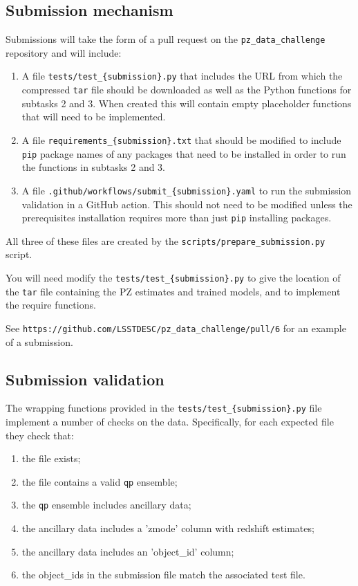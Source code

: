 \documentclass[11pt,twoside,letterpaper,onecolumn,english]{article}
\begin{document}
\subsection{Submission mechanism}

Submissions will take the form of a pull request on the
\texttt{pz\_data\_challenge} repository and will include:

\begin{enumerate}
  \item{A file \texttt{tests/test\_\{submission\}.py} that includes the
      URL from which the compressed \texttt{tar} file should be downloaded
      as well as the Python functions for subtasks 2 and 3.   When
      created this will contain empty placeholder functions that will
      need to be implemented.}
   \item{A file \texttt{requirements\_\{submission\}.txt} that should
       be modified to include \texttt{pip} package names of any
       packages that need to be installed in order to run the
       functions in subtasks 2 and 3.}     
   \item{A file \texttt{.github/workflows/submit\_\{submission\}.yaml} to
       run the submission validation in a GitHub action.  This should
       not need to be modified unless the prerequisites installation
       requires more than just \texttt{pip}  installing packages.}
\end{enumerate}

All three of these files are created by the
\texttt{scripts/prepare\_submission.py} script.  

You will need modify the \texttt{tests/test\_\{submission\}.py} to
give the location of the \texttt{tar} file containing the PZ estimates
and trained models, and to implement the require functions.

See \texttt{https://github.com/LSSTDESC/pz\_data\_challenge/pull/6}
for an example of a submission.


\subsection{Submission validation}

The wrapping functions provided in the \texttt{tests/test\_\{submission\}.py}
file implement a number of \allowbreak checks on the data. Specifically, for each
expected file they check that:

\begin{enumerate}
    \item{the file exists;}
    \item{the file contains a valid \texttt{qp} ensemble;}
    \item{the \texttt{qp} ensemble includes ancillary data;}
    \item{the ancillary data includes a 'zmode' column with redshift
        estimates;}
    \item{the ancillary data includes an 'object\_id' column;}
    \item{the object\_ids in the submission file match the associated
        test file.}
\end{enumerate}
\end{document}
